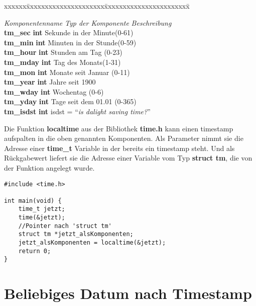 \documentclass[c_worksheet.tex]{subfiles}
\begin{document}
\begin{tabbing}
xxxxxx\=xxxxxxxxxxxxxxxxxxxxx\=xxxxxxxxxxxxxxxxxxxxxxx\= \kill

\>\textit{Komponentenname} \>\textit{Typ der Komponente} \>\textit{Beschreibung} \\
\>\textbf{ tm\_sec}\> \textbf{ int}\> Sekunde in der Minute(0-61) \footnotemark \\
\>\textbf{ tm\_min}\> \textbf{ int}\> Minuten in der Stunde(0-59)\\
\>\textbf{ tm\_hour}\> \textbf{ int}\> Stunden am Tag (0-23)\\
\>\textbf{ tm\_mday}\> \textbf{ int}\> Tag des Monats(1-31)\\
\>\textbf{ tm\_mon}\> \textbf{ int}\> Monate seit Januar (0-11)\\
\>\textbf{ tm\_year}\> \textbf{ int}\> Jahre seit 1900\\
\>\textbf{ tm\_wday}\> \textbf{ int}\> Wochentag (0-6)\\
\>\textbf{ tm\_yday}\> \textbf{ int}\> Tage seit dem 01.01 (0-365)\\
\>\textbf{ tm\_isdst}\> \textbf{ int}\> isdst = ``\textit{is dalight saving time?}''\footnotemark
\end{tabbing}

\addtocounter{footnote}{-2}


Die Funktion \textbf{localtime} aus der Bibliothek \textbf{time.h} kann einen timestamp aufspalten in die oben genannten Komponenten. Als Parameter nimmt sie die Adresse einer \textbf{time\_t} Variable in der bereits ein timestamp steht. Und als Rückgabewert liefert sie die Adresse einer Variable vom Typ \textbf{struct tm}, die von der Funktion angelegt wurde.

\begin{lstlisting}
#include <time.h>

int main(void) {
    time_t jetzt;
    time(&jetzt);
    //Pointer nach 'struct tm'
    struct tm *jetzt_alsKomponenten;
    jetzt_alsKomponenten = localtime(&jetzt);
    return 0;
}
\end{lstlisting}

\section{Beliebiges Datum nach Timestamp}
\end{document}
